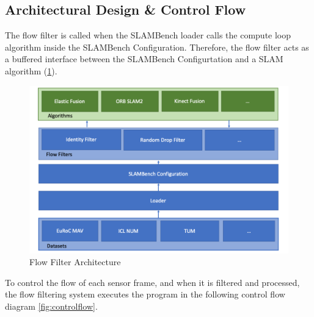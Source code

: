 \subsection{Architectural Design \& Control Flow}

The flow filter is called when the SLAMBench loader calls the compute loop algorithm inside the SLAMBench Configuration. 
Therefore, the flow filter acts as a buffered interface between the SLAMBench Configurtation and a SLAM algorithm (\ref{fig:flowarc}).

\begin{figure}[!htbp]
	\caption{\label{fig:flowarc}Flow Filter Architecture}
	\includegraphics[width=14cm]{figures/flow-filter-architecture.png}
	\centering
\end{figure}

To control the flow of each sensor frame, and when it is filtered and processed, the flow filtering system executes the program in the following control flow diagram \ref{fig:controlflow}.


